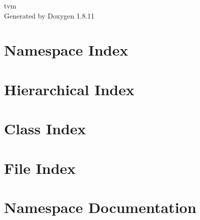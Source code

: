 \documentclass[twoside]{book}
\newcommand{\+}{\discretionary{\mbox{\scriptsize$\hookleftarrow$}}{}{}}
\newcommand{\clearemptydoublepage}{%
  \newpage{\pagestyle{empty}\cleardoublepage}%
}
\begin{document}
\hypersetup{pageanchor=false,
             bookmarksnumbered=true,
             pdfencoding=unicode
            }
\begin{titlepage}
\vspace*{7cm}
\begin{center}%
{\Large tvm }\\
\vspace*{1cm}
{\large Generated by Doxygen 1.8.11}\\
\end{center}
\end{titlepage}
\clearemptydoublepage
\tableofcontents
\clearemptydoublepage
{}
\hypersetup{pageanchor=true}

\chapter{Namespace Index}

\chapter{Hierarchical Index}

\chapter{Class Index}

\chapter{File Index}

\chapter{Namespace Documentation}































\end{document}
